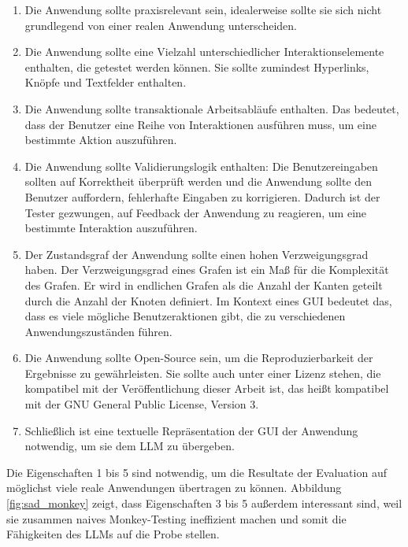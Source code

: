 \begin{enumerate}
    \item
        Die Anwendung sollte praxisrelevant sein, idealerweise sollte sie sich nicht grundlegend von einer realen Anwendung unterscheiden.
    \item
        Die Anwendung sollte eine Vielzahl unterschiedlicher Interaktionselemente ent\-hal\-ten, die getestet werden können. 
        Sie sollte zumindest Hyperlinks, Knöpfe und Textfelder enthalten.
    \item
        Die Anwendung sollte transaktionale Arbeitsabläufe enthalten.
        Das bedeutet, dass der Benutzer eine Reihe von Interaktionen ausführen muss, um eine bestimmte Aktion auszuführen.
    \item
        Die Anwendung sollte Validierungslogik enthalten: Die Benutzereingaben sollten auf Korrektheit überprüft werden und die Anwendung sollte den Benutzer auffordern, fehlerhafte Eingaben zu korrigieren.
        Dadurch ist der Tester gezwungen, auf Feedback der Anwendung zu reagieren, um eine bestimmte Interaktion auszuführen.
    \item
        Der Zustandsgraf der Anwendung sollte einen hohen Verzweigungsgrad haben.
        Der Verzweigungsgrad eines Grafen ist ein Maß für die Komplexität des Grafen.
        Er wird in endlichen Grafen als die Anzahl der Kanten geteilt durch die Anzahl der Knoten definiert.
        Im Kontext eines GUI bedeutet das, dass es viele mögliche Benutzeraktionen gibt, die zu verschiedenen Anwendungszuständen führen.
    \item 
        Die Anwendung sollte Open-Source sein, um die Reproduzierbarkeit der Ergebnisse zu gewährleisten.
        Sie sollte auch unter einer Lizenz stehen, die kompatibel mit der Veröffentlichung dieser Arbeit ist, das heißt kompatibel mit der GNU General Public License, Version 3.
    \item Schließlich ist eine textuelle Repräsentation der GUI der Anwendung notwendig, um sie dem LLM zu übergeben.
\end{enumerate}

Die Eigenschaften 1 bis 5 sind notwendig, um die Resultate der Evaluation auf möglichst viele reale Anwendungen übertragen zu können.
Abbildung \ref{fig:sad_monkey} zeigt, dass Eigenschaften 3 bis 5 außerdem interessant sind, weil sie zusammen naives Monkey-Testing ineffizient machen und somit die Fähigkeiten des LLMs auf die Probe stellen.

